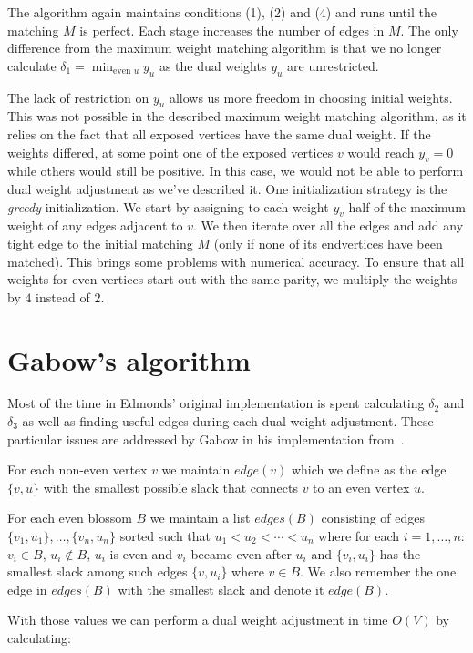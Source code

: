 The algorithm again maintains conditions (1), (2) and (4) and runs until the matching $M$ is perfect. Each stage increases the number of edges in $M$. The only difference from the maximum weight matching algorithm is that we no longer calculate $\delta_1 = \min_{\text{even } u} y_u$ as the dual weights $y_u$ are unrestricted.

The lack of restriction on $y_u$ allows us more freedom in choosing initial weights. This was not possible in the described maximum weight matching algorithm, as it relies on the fact that all exposed vertices have the same dual weight. If the weights differed, at some point one of the exposed vertices $v$ would reach $y_v = 0$ while others would still be positive. In this case, we would not be able to perform dual weight adjustment as we've described it. One initialization strategy is the \emph{greedy} initialization. We start by assigning to each weight $y_v$ half of the maximum weight of any edges adjacent to $v$. We then iterate over all the edges and add any tight edge to the initial matching $M$ (only if none of its endvertices have been matched). This brings some problems with numerical accuracy. To ensure that all weights for even vertices start out with the same parity, we multiply the weights by $4$ instead of $2$.

\section{Gabow's algorithm}

Most of the time in Edmonds' original implementation is spent calculating $\delta_2$ and $\delta_3$ as well as finding useful edges during each dual weight adjustment. These particular issues are addressed by Gabow in his implementation from~\cite{gabow1974implementation}.

For each non-even vertex $v$ we maintain $edge(v)$ which we define as the edge $\{v, u\}$ with the smallest possible slack that connects $v$ to an even vertex $u$.

For each even blossom $B$ we maintain a list $edges(B)$ consisting of edges $\{v_1, u_1\}, \dots, \{v_n, u_n\}$ sorted such that $u_1 < u_2 < \cdots < u_n$ where for each $i = 1, \dots, n$: $v_i \in B$, $u_i \notin B$, $u_i$ is even and $v_i$ became even after $u_i$ and $\{v_i, u_i\}$ has the smallest slack among such edges $\{v, u_i\}$ where $v \in B$. We also remember the one edge in $edges(B)$ with the smallest slack and denote it $edge(B)$.

With those values we can perform a dual weight adjustment in time $O(V)$ by calculating:

